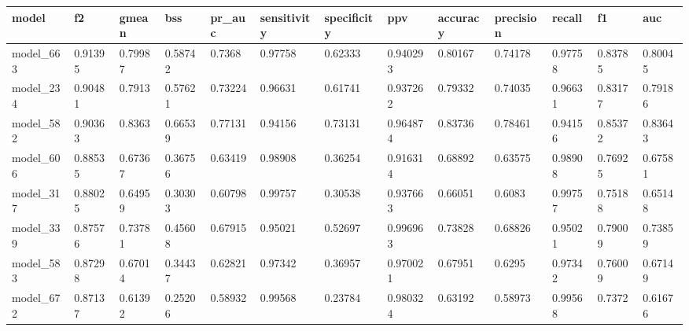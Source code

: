 \begin{tabular}{|l|l|l|l|l|l|l|l|l|l|l|l|l|}
\hline
\textbf{model} & \textbf{f2} & \textbf{gmean} & \textbf{bss} & \textbf{pr\_auc} & \textbf{sensitivity} & \textbf{specificity} & \textbf{ppv} & \textbf{accuracy} & \textbf{precision} & \textbf{recall} & \textbf{f1} & \textbf{auc} \\ \hline
model\_663     & 0.91395     & 0.79987        & 0.58742      & 0.7368           & 0.97758              & 0.62333              & 0.940293     & 0.80167           & 0.74178            & 0.97758         & 0.83785     & 0.80045      \\ \hline
model\_234     & 0.90481     & 0.7913         & 0.57621      & 0.73224          & 0.96631              & 0.61741              & 0.937262     & 0.79332           & 0.74035            & 0.96631         & 0.83177     & 0.79186      \\ \hline
model\_582     & 0.90363     & 0.8363         & 0.66539      & 0.77131          & 0.94156              & 0.73131              & 0.964874     & 0.83736           & 0.78461            & 0.94156         & 0.85372     & 0.83643      \\ \hline
model\_606     & 0.88535     & 0.67367        & 0.36756      & 0.63419          & 0.98908              & 0.36254              & 0.916314     & 0.68892           & 0.63575            & 0.98908         & 0.76925     & 0.67581      \\ \hline
model\_317     & 0.88025     & 0.64959        & 0.30303      & 0.60798          & 0.99757              & 0.30538              & 0.937663     & 0.66051           & 0.6083             & 0.99757         & 0.75188     & 0.65148      \\ \hline
model\_339     & 0.87576     & 0.73781        & 0.45608      & 0.67915          & 0.95021              & 0.52697              & 0.996963     & 0.73828           & 0.68826            & 0.95021         & 0.79009     & 0.73859      \\ \hline
model\_583     & 0.87298     & 0.67014        & 0.34437      & 0.62821          & 0.97342              & 0.36957              & 0.970021     & 0.67951           & 0.6295             & 0.97342         & 0.76009     & 0.67149      \\ \hline
model\_672     & 0.87137     & 0.61392        & 0.25206      & 0.58932          & 0.99568              & 0.23784              & 0.980324     & 0.63192           & 0.58973            & 0.99568         & 0.7372      & 0.61676      \\ \hline

\end{tabular}
